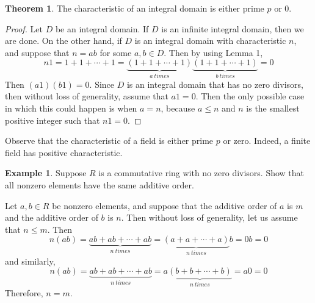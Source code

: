 \documentclass[11pt]{article}
\theoremstyle{definition}\newtheorem{definition}{Definition}
\theoremstyle{definition}\newtheorem*{notation}{Notation}
\theoremstyle{definition}\newtheorem{example}{Example}
\theoremstyle{theorem}\newtheorem{theorem}{Theorem}
\theoremstyle{theorem}\newtheorem{corollary}{Corollary}
\theoremstyle{theorem}\newtheorem{proposition}{Proposition}
\theoremstyle{theorem}\newtheorem{lemma}{Lemma}
\theoremstyle{theorem}\newtheorem{question}{Question}
\theoremstyle{remark}\newtheorem{remark}{Remark}
\begin{document}
\begin{theorem}
    The characteristic of an integral domain is either prime $p$ or 0.
\end{theorem}

\begin{proof}
    Let $D$ be an integral domain. If $D$ is an infinite integral domain, then we are done. On the other hand, if $D$ is an integral domain with characteristic $n$, and suppose that $n = ab$ for some $a, b \in D$. Then by using Lemma 1,
    \begin{equation*}
        n1 = 1 + 1 + \cdots + 1 = \underbrace{(1 + 1 + \cdots + 1)}_{a \ times}\underbrace{(1 + 1 + \cdots + 1)}_{b \ times} = 0
    \end{equation*}
    Then $(a1)(b1) = 0$. Since $D$ is an integral domain that has no zero divisors, then without loss of generality, assume that $a1 = 0$. Then the only possible case in which this could happen is when $a = n$, because $a \leq n$ and $n$ is the smallest positive integer such that $n1 = 0$.
\end{proof}

Observe that the characteristic of a field is either prime $p$ or zero. Indeed, a finite field has positive characteristic.

\begin{example}
    Suppose $R$ is a commutative ring with no zero divisors. Show that all nonzero elements have the same additive order.

    Let $a, b \in R$ be nonzero elements, and suppose that the additive order of $a$ is $m$ and the additive order of $b$ is $n$. Then without loss of generality, let us assume that $n \leq m$. Then
    \begin{equation*}
        n(ab) = \underbrace{ab + ab + \cdots + ab}_{n \ times} = \underbrace{(a + a + \cdots + a)}_{n \ times} b = 0b = 0
    \end{equation*}
    and similarly,
    \begin{equation*}
        n(ab) = \underbrace{ab + ab + \cdots + ab}_{n \ times} = a\underbrace{(b + b + \cdots + b)}_{n \ times} = a0 = 0
    \end{equation*}
    Therefore, $n = m$.
\end{example}
\end{document}
